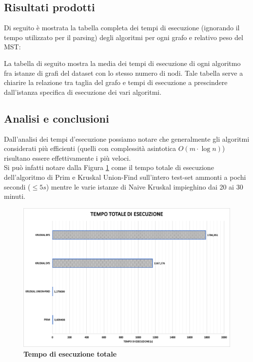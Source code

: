 \documentclass[]{article}
\begin{document}
\subsection{Risultati prodotti}
\begin{flushleft}
Di seguito è mostrata la tabella completa dei tempi di esecuzione (ignorando il tempo utilizzato per il parsing) degli algoritmi per ogni grafo e relativo peso del MST: 


La tabella di seguito mostra la media dei tempi di esecuzione di ogni algoritmo fra istanze di grafi del dataset con lo stesso numero di nodi. Tale tabella serve a chiarire la relazione tra taglia del grafo e tempi di esecuzione a prescindere dall'istanza specifica di esecuzione dei vari algoritmi.

\newpage
\subsection{Analisi e conclusioni}
Dall'analisi dei tempi d'esecuzione possiamo notare che generalmente gli algoritmi considerati più efficienti (quelli con complessità asintotica $O(m\cdot\log n)$) risultano essere effettivamente i più veloci.\\
Si può infatti notare dalla Figura \ref{total} come il tempo totale di esecuzione dell'algoritmo di Prim e Kruskal Union-Find sull'intero test-set ammonti a pochi secondi ($\leq 5 s$) mentre le varie istanze di Naive Kruskal impieghino dai 20 ai 30 minuti.
\begin{figure}[H]
	\centering
	\includegraphics[width=\textwidth,height=\textheight,keepaspectratio]{grafo_costo_totale.png}
	\caption{\textbf{Tempo di esecuzione totale}}
	\label{total}
\end{figure}


\end{flushleft}
\end{document}
